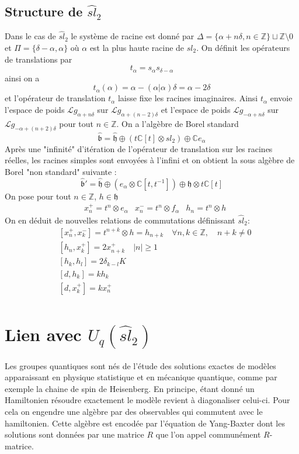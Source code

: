 \documentclass[12pt]{article}
\theoremstyle{definition}
\begin{document}
\subsection{Structure de $\widehat{sl}_{2}$}
Dans le cas de $\widehat{sl}_{2}$ le système de racine est donné par $\Delta=\{\alpha +n\delta , n\in\mathbb{Z}\}\sqcup\mathbb{Z}\setminus{0}$ et $\Pi=\{\delta-\alpha,\alpha\}$ où $\alpha$ est la plus haute racine de $sl_{2}$. On définit les opérateurs de translations par $$t_{\alpha}=s_{\alpha}s_{\delta-\alpha}$$ ainsi on a $$ t_{\alpha}(\alpha)=\alpha-(\alpha\vert\alpha)\delta=\alpha-2\delta$$ et l'opérateur de translation $t_{\alpha}$ laisse fixe les racines imaginaires. Ainsi $t_{\alpha}$ envoie l'espace de poids $\mathcal{L}g_{\alpha + n\delta}$ sur $\mathcal{L}g_{\alpha + (n-2)\delta}$  et l'espace de poids $\mathcal{L}g_{-\alpha + n\delta}$ sur $\mathcal{L}g_{-\alpha + (n+2)\delta}$ pour tout $n\in\mathbb{Z}$. On a l'algèbre de Borel standard $$\widehat{\mathfrak{b}}=\widehat{\mathfrak{h}}\oplus(t\mathbb{C}[t]\otimes sl_{2})\oplus\mathbb{C}e_{\alpha}$$ Après une "infinité" d'itération de l'opérateur de translation sur les racines réelles, les racines simples sont envoyées à l'infini et on obtient la sous algèbre de Borel "non standard" suivante :
$$\widehat{\mathfrak{b}}'=\widehat{\mathfrak{h}}\oplus (e_{\alpha}\otimes\mathbb{C}[t,t^{-1}])\oplus\mathfrak{h}\otimes t\mathbb{C}[t]$$ On pose pour tout $n\in\mathbb{Z}$, $h\in\mathfrak{h}$ \begin{align*}
& x_{n}^{+}=t^{n}\otimes e_{\alpha}
& x_{n}^{-}=t^{n}\otimes f_{\alpha}
& h_{n}= t^{n}\otimes h
\end{align*}
On en déduit de nouvelles relations de commutations définissant $\widehat{sl}_{2}$: \begin{align*}
&[x_{n}^{+},x_{k}^{-}]=t^{n+k}\otimes h=h_{n+k}\quad\forall n,k\in\mathbb{Z},\quad n+k\neq 0\\
&[h_n,x_k^{+}]=2x_{n+k}^{+}\quad \vert n\vert\geqslant 1\\
&[h_k,h_l]=2\delta_{k-l}K\\
&[d,h_k]=kh_k\\
&[d,x_k^{+}]=kx_n^{+}\\
\end{align*}
\pagebreak
\section{Lien avec $U_q(\widehat{sl}_{2})$}
Les groupes quantiques sont nés de l'étude des solutions exactes de modèles apparaissant en physique statistique et en mécanique quantique, comme par exemple la chaine de spin de Heisenberg. En principe, étant donné un Hamiltonien résoudre exactement le modèle revient à diagonaliser celui-ci. Pour cela on engendre une algèbre par des observables qui commutent avec le hamiltonien. Cette algèbre est encodée par l'équation de Yang-Baxter dont les solutions sont données par une matrice $R$ que l'on appel communément $R$-matrice.\vspace{0.5cm}
\end{document}
